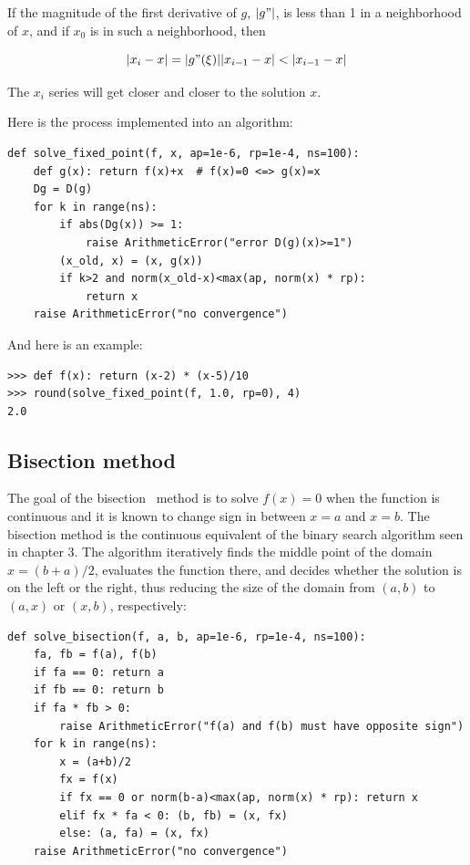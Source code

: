 \documentclass[justified, sixbynine]{tufte-book}
\def\ft{\small\tt}
\theoremstyle{plain}%
\newtheorem * {corollary}{Corollary}
\theoremstyle{definition}
\theoremstyle{remark}
\newtheorem * {remark}{Remark}
\newtheorem * {note}{Note}
\begin{document}
\begin{fullwidth}
If the magnitude of the first derivative of $g$, $|g"|$, is less than 1 in a neighborhood of $x$, and if $x_0$ is in such a neighborhood, then

\begin{equation}
|x_i - x| = |g"(\xi)||x_{i-1}-x| < |x_{i-1}-x|
\end{equation}

The $x_i$ series will get closer and closer to the solution $x$.

Here is the process implemented into an algorithm:

\begin{lstlisting}[caption={in file: {\ft nlib.py}}]
def solve_fixed_point(f, x, ap=1e-6, rp=1e-4, ns=100):
    def g(x): return f(x)+x  # f(x)=0 <=> g(x)=x
    Dg = D(g)
    for k in range(ns):
        if abs(Dg(x)) >= 1:
            raise ArithmeticError("error D(g)(x)>=1")
        (x_old, x) = (x, g(x))
        if k>2 and norm(x_old-x)<max(ap, norm(x) * rp):
            return x
    raise ArithmeticError("no convergence")
\end{lstlisting}

And here is an example:

\begin{lstlisting}[caption={in file: {\ft nlib.py}}]
>>> def f(x): return (x-2) * (x-5)/10
>>> round(solve_fixed_point(f, 1.0, rp=0), 4)
2.0
\end{lstlisting}

\goodbreak\subsection{Bisection method}


The goal of the bisection~\cite{bisection} method is to solve $f(x)=0$ when the function is continuous and it is known to change sign in between $x=a$ and $x=b$. The bisection method is the continuous equivalent of the binary search algorithm seen in chapter 3. The algorithm iteratively finds the middle point of the domain $x=(b+a)/2$, evaluates the function there, and decides whether the solution is on the left or the right, thus reducing the size of the domain from $(a, b)$ to $(a, x)$ or $(x, b)$, respectively:

\begin{lstlisting}[caption={in file: {\ft nlib.py}}]
def solve_bisection(f, a, b, ap=1e-6, rp=1e-4, ns=100):
    fa, fb = f(a), f(b)
    if fa == 0: return a
    if fb == 0: return b
    if fa * fb > 0:
        raise ArithmeticError("f(a) and f(b) must have opposite sign")
    for k in range(ns):
        x = (a+b)/2
        fx = f(x)
        if fx == 0 or norm(b-a)<max(ap, norm(x) * rp): return x
        elif fx * fa < 0: (b, fb) = (x, fx)
        else: (a, fa) = (x, fx)
    raise ArithmeticError("no convergence")
\end{lstlisting}


\end{fullwidth}
\end{document}
